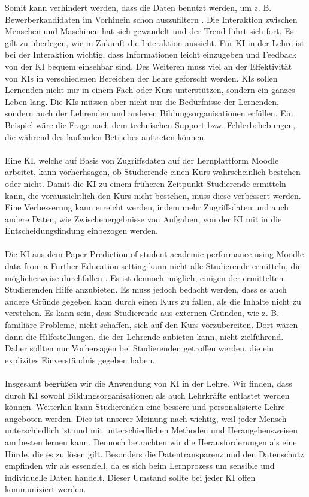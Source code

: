Somit kann verhindert werden, dass die Daten benutzt werden, um z. B. Bewerberkandidaten im Vorhinein schon auszufiltern \cite[S. 8f]{Pinkwart.2016}.
Die Interaktion zwischen Menschen und Maschinen hat sich gewandelt und der Trend führt sich fort. Es gilt zu überlegen, wie in Zukunft die Interaktion aussieht.
Für KI in der Lehre ist bei der Interaktion wichtig, dass Informationen leicht einzugeben und Feedback von der KI bequem einsehbar sind.
Des Weiteren muss viel an der Effektivität von KIs in verschiedenen Bereichen der Lehre geforscht werden. KIs sollen Lernenden nicht nur in einem Fach oder Kurs unterstützen, sondern ein ganzes Leben lang.
Die KIs müssen aber nicht nur die Bedürfnisse der Lernenden, sondern auch der Lehrenden und anderen Bildungsorganisationen erfüllen.
Ein Beispiel wäre die Frage nach dem technischen Support bzw. Fehlerbehebungen, die während des laufenden Betriebes auftreten können.\cite[S. 10ff]{Pinkwart.2016}
\\
\\ \noindent
Eine KI, welche auf Basis von Zugriffsdaten auf der Lernplattform Moodle arbeitet, kann vorherhsagen, ob Studierende einen Kurs wahrscheinlich bestehen oder nicht.
Damit die KI zu einem früheren Zeitpunkt Studierende ermitteln kann, die voraussichtlich den Kurs nicht bestehen, muss diese verbessert werden.
Eine Verbesserung kann erreicht werden, indem mehr Zugriffsdaten und auch andere Daten, wie Zwischenergebnisse von Aufgaben, von der KI mit in die Entscheidungsfindung einbezogen werden. \cite[S. 14f]{Quinn.2020}
\\ \noindent
\\ \noindent
Die KI aus dem Paper \glqq Prediction of student academic performance using Moodle data from a Further Education setting\grqq{} kann nicht alle Studierende ermitteln, die möglicherweise durchfallen \cite[S. 16]{Quinn.2020}.
Es ist dennoch möglich, einigen der ermittelten Studierenden Hilfe anzubieten. Es muss jedoch bedacht werden, dass es auch andere Gründe gegeben kann durch einen Kurs zu fallen, als die Inhalte nicht zu verstehen.
Es kann sein, dass Studierende aus externen Gründen, wie z. B. familiäre Probleme, nicht schaffen, sich auf den Kurs vorzubereiten.
Dort wären dann die Hilfestellungen, die der Lehrende anbieten kann, nicht zielführend.
Daher sollten nur Vorhersagen bei Studierenden getroffen werden, die ein explizites Einverständnis gegeben haben.
\\
\\
\noindent
Insgesamt begrüßen wir die Anwendung von KI in der Lehre. Wir finden, dass durch KI sowohl Bildungsorganisationen als auch Lehrkräfte entlastet werden können. Weiterhin kann Studierenden eine bessere und personalisierte Lehre angeboten werden. Dies ist unserer Meinung nach wichtig, weil jeder Mensch unterschiedlich ist und mit unterschiedlichen Methoden und Herangehensweisen am besten lernen kann. Dennoch betrachten wir die Herausforderungen als eine Hürde, die es zu lösen gilt. Besonders die Datentransparenz und den Datenschutz empfinden wir als essenziell, da es sich beim Lernprozess um sensible und  individuelle Daten handelt. Dieser Umstand sollte bei jeder KI offen kommuniziert werden.